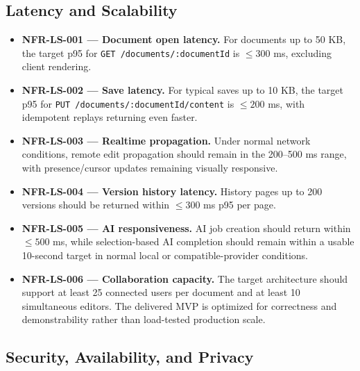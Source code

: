 \subsection{Latency and Scalability}

\begin{itemize}
  \item \textbf{NFR-LS-001 --- Document open latency.} For documents up to 50 KB, the target p95 for
  \texttt{GET /documents/:documentId} is $\leq 300$ ms, excluding client rendering.
  \item \textbf{NFR-LS-002 --- Save latency.} For typical saves up to 10 KB, the target p95 for
  \texttt{PUT /documents/:documentId/content} is $\leq 200$ ms, with idempotent replays returning even faster.
  \item \textbf{NFR-LS-003 --- Realtime propagation.} Under normal network conditions, remote edit
  propagation should remain in the 200--500 ms range, with presence/cursor updates remaining visually
  responsive.
  \item \textbf{NFR-LS-004 --- Version history latency.} History pages up to 200 versions should be
  returned within $\leq 300$ ms p95 per page.
  \item \textbf{NFR-LS-005 --- AI responsiveness.} AI job creation should return within $\leq 500$ ms,
  while selection-based AI completion should remain within a usable 10-second target in normal local or
  compatible-provider conditions.
  \item \textbf{NFR-LS-006 --- Collaboration capacity.} The target architecture should support at least 25
  connected users per document and at least 10 simultaneous editors. The delivered MVP is optimized for
  correctness and demonstrability rather than load-tested production scale.
\end{itemize}

\subsection{Security, Availability, and Privacy}

